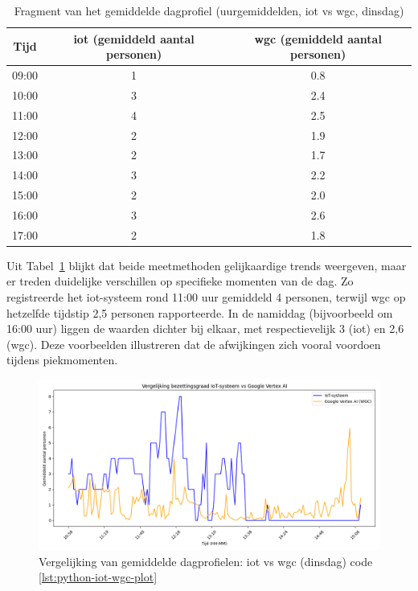 \begin{table}[H]
    \centering
    \caption{Fragment van het gemiddelde dagprofiel (uurgemiddelden, \gls{iot} vs \gls{wgc}, dinsdag)}
    \label{tab:dagprofiel}
    \begin{tabular}{|c|c|c|}
        \hline
        \textbf{Tijd} & \textbf{\gls{iot} (gemiddeld aantal personen)} & \textbf{\gls{wgc} (gemiddeld aantal personen)} \\
        \hline
        09:00 & 1 & 0.8 \\
        10:00 & 3 & 2.4 \\
        11:00 & 4 & 2.5 \\
        12:00 & 2 & 1.9 \\
        13:00 & 2 & 1.7 \\
        14:00 & 3 & 2.2 \\
        15:00 & 2 & 2.0 \\
        16:00 & 3 & 2.6 \\
        17:00 & 2 & 1.8 \\
        \hline
    \end{tabular}
\end{table}

Uit Tabel~\ref{tab:dagprofiel} blijkt dat beide meetmethoden gelijkaardige trends weergeven, maar er treden duidelijke verschillen op specifieke momenten van de dag. Zo registreerde het \gls{iot}-systeem rond 11:00 uur gemiddeld 4 personen, terwijl \gls{wgc} op hetzelfde tijdstip 2,5 personen rapporteerde. In de namiddag (bijvoorbeeld om 16:00 uur) liggen de waarden dichter bij elkaar, met respectievelijk 3 (\gls{iot}) en 2,6 (\gls{wgc}). Deze voorbeelden illustreren dat de afwijkingen zich vooral voordoen tijdens piekmomenten. \\

\begin{figure}[H]
    \centering
    \includegraphics[width=\textwidth]{img/bp/Figure_1.png}
    \caption{Vergelijking van gemiddelde dagprofielen: \gls{iot} vs \gls{wgc} (dinsdag) code \ref{lst:python-iot-wgc-plot}}
    \label{fig:dagprofiel}
\end{figure}

